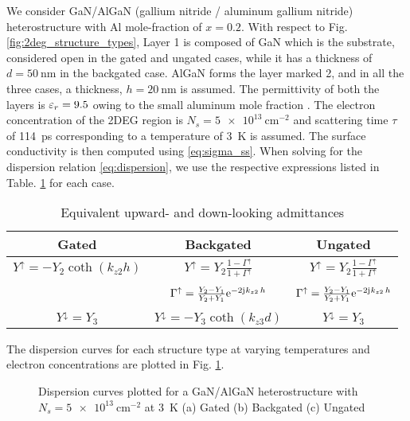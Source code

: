 We consider GaN/AlGaN (gallium nitride / aluminum gallium nitride)  heterostructure with Al mole-fraction of $x = \num[round-precision=1]{0.2}$. With respect to Fig. \ref{fig:2deg_structure_types}, Layer 1 is composed of GaN which is the substrate, considered open in the gated and ungated cases, while it has a thickness of $d = \SI{50}{\nm}$ in the backgated case. AlGaN forms the layer marked 2, and in all the three cases, a thickness, $h = \SI{20}{\nm}$ is assumed. The permittivity of both the layers is $\varepsilon_r = 9.5$ owing to the small aluminum mole fraction \cite{Muravjov2010}. The electron concentration of the 2DEG region is $N_s = \SI{5e13}{\cm^{-2}}$ and scattering time $\tau$ of \SI{114}{\ps} corresponding to a temperature of \SI{3}{\kelvin} is assumed. The surface conductivity is then computed using \eqref{eq:sigma_ss}. When solving for the dispersion relation \eqref{eq:dispersion}, we use the respective expressions listed in Table. \ref{tab:equations} for each case.
%
\begin{table}[!htbp]
\begin{center}
 \begin{tabular}{|c |c |c|}
 \hline
 Gated & Backgated  & Ungated \\ [0.5ex]
 \hline\hline
 $Y^{\uparrow} = - Y_{2} \coth (k_{z2} h)$ & $Y^{\uparrow} = Y_{2} \frac{1 - \Gamma^{\uparrow}}{1 + \Gamma^{\uparrow}}$ & $Y^{\uparrow} = Y_{2} \frac{1 - \Gamma^{\uparrow}}{1 + \Gamma^{\uparrow}}$ \\  & & \\ [2ex]
\num{} & $\Gamma^{\uparrow} = \frac{Y_2 - Y_1}{Y_2 + Y_1} \mathrm{e}^{-2\mathrm{j}\mkern1mu k_{z2}\, h}$ & $\Gamma^{\uparrow} = \frac{Y_2 - Y_1}{Y_2 + Y_1} \mathrm{e}^{-2\mathrm{j}\mkern1mu k_{z2}\, h}$ \\  & &  \\ [2ex]
 $Y^{\downarrow} = Y_{3}$ & $Y^{\downarrow} = - Y_{3} \coth (k_{z3} d)$ &  $Y^{\downarrow} = Y_{3}$ \\
 \hline
 \end{tabular}
  \end{center}
 \caption{Equivalent upward- and down-looking admittances}
 \label{tab:equations}
\end{table}
%

The dispersion curves for each structure type at varying temperatures and electron concentrations are plotted in Fig. \ref{fig:dispersion_hif_lowT}.
%
\begin{figure}[!htbp]
  \centering
   \hfil
  \caption{Dispersion curves plotted for a GaN/AlGaN heterostructure with $N_s = \SI{5e13}{\cm^{-2}}$ at \SI{3}{\kelvin} (a) Gated (b) Backgated (c) Ungated}
  \label{fig:dispersion_hif_lowT}
\end{figure}
%

